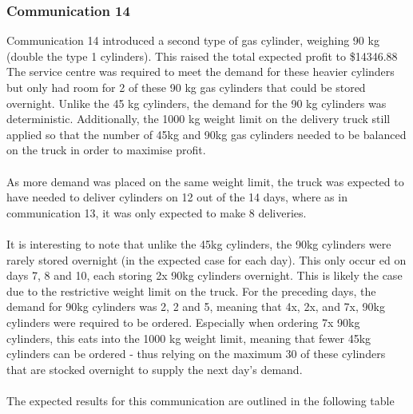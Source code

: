 \documentclass{article}
\begin{document}
\bigskip
\newpage
\subsubsection{Communication 14}

Communication 14 introduced a second type of gas cylinder, weighing 90 kg (double the type 1 cylinders). This raised the total expected profit to \$14346.88 The service centre was required to meet the demand for these heavier cylinders but only had room for 2 of these 90 kg gas cylinders that could be stored overnight. Unlike the 45 kg cylinders, the demand for the 90 kg cylinders was deterministic. Additionally, the 1000 kg weight limit on the delivery truck still applied so that the number of 45kg and 90kg gas cylinders needed to be balanced on the truck in order to maximise profit.\\
\\
As more demand was placed on the same weight limit, the truck was expected to have needed to deliver cylinders on 12 out of the 14 days, where as in communication 13, it was only expected to make 8 deliveries.\\
\\
It is interesting to note that unlike the 45kg cylinders, the 90kg cylinders were rarely stored overnight (in the expected case for each day). This only occur ed on days 7, 8 and 10, each storing 2x 90kg cylinders overnight. This is likely the case due to the restrictive weight limit on the truck. For the preceding days, the demand for 90kg cylinders was 2, 2 and 5, meaning that 4x, 2x, and 7x, 90kg cylinders were required to be ordered. Especially when ordering 7x 90kg cylinders, this eats into the 1000 kg weight limit, meaning that fewer 45kg cylinders can be ordered - thus relying on the maximum 30 of these cylinders that are stocked overnight to supply the next day's demand.\\
\\
The expected results for this communication are outlined in the following table
\end{document}
